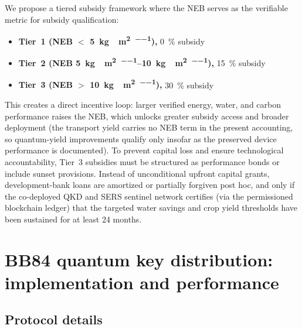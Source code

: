 \documentclass[11pt,a4paper]{article}
\begin{document}
We propose a tiered subsidy framework where the NEB serves as the verifiable metric for subsidy qualification:
\begin{itemize}
\item \textbf{Tier~1 (NEB $<$ \qty{5}{\kg{}\per\m\squared\per\yr}),} \qty{0}{\percent} subsidy
\item \textbf{Tier~2 (NEB \qtyrange{5}{10}{\kg{}\per\m\squared\per\yr}),} \qty{15}{\percent} subsidy
\item \textbf{Tier~3 (NEB $>$ \qty{10}{\kg{}\per\m\squared\per\yr}),} \qty{30}{\percent} subsidy
\end{itemize}
This creates a direct incentive loop: larger verified energy, water, and carbon performance raises the NEB, which unlocks greater subsidy access and broader deployment (the transport yield carries no NEB term in the present accounting, so quantum-yield improvements qualify only insofar as the preserved device performance is documented). To prevent capital loss and ensure technological accountability, Tier~3 subsidies must be structured as performance bonds or include sunset provisions. Instead of unconditional upfront capital grants, development-bank loans are amortized or partially forgiven post hoc, and only if the co-deployed QKD and SERS sentinel network certifies (via the permissioned blockchain ledger) that the targeted water savings and crop yield thresholds have been sustained for at least 24 months.


\section{BB84 quantum key distribution: implementation and performance}
\label{SI-sec:qkd}\label{SI-sec:bb84}

\subsection{Protocol details}
\end{document}
